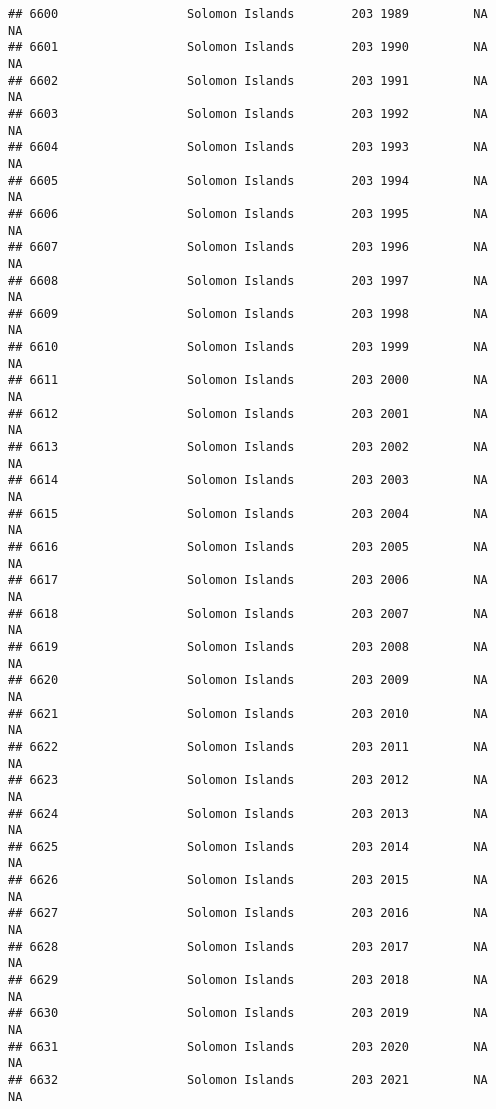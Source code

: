\documentclass[
]{article}
\begin{document}
\begin{verbatim}
## 6600                  Solomon Islands        203 1989         NA         NA
## 6601                  Solomon Islands        203 1990         NA         NA
## 6602                  Solomon Islands        203 1991         NA         NA
## 6603                  Solomon Islands        203 1992         NA         NA
## 6604                  Solomon Islands        203 1993         NA         NA
## 6605                  Solomon Islands        203 1994         NA         NA
## 6606                  Solomon Islands        203 1995         NA         NA
## 6607                  Solomon Islands        203 1996         NA         NA
## 6608                  Solomon Islands        203 1997         NA         NA
## 6609                  Solomon Islands        203 1998         NA         NA
## 6610                  Solomon Islands        203 1999         NA         NA
## 6611                  Solomon Islands        203 2000         NA         NA
## 6612                  Solomon Islands        203 2001         NA         NA
## 6613                  Solomon Islands        203 2002         NA         NA
## 6614                  Solomon Islands        203 2003         NA         NA
## 6615                  Solomon Islands        203 2004         NA         NA
## 6616                  Solomon Islands        203 2005         NA         NA
## 6617                  Solomon Islands        203 2006         NA         NA
## 6618                  Solomon Islands        203 2007         NA         NA
## 6619                  Solomon Islands        203 2008         NA         NA
## 6620                  Solomon Islands        203 2009         NA         NA
## 6621                  Solomon Islands        203 2010         NA         NA
## 6622                  Solomon Islands        203 2011         NA         NA
## 6623                  Solomon Islands        203 2012         NA         NA
## 6624                  Solomon Islands        203 2013         NA         NA
## 6625                  Solomon Islands        203 2014         NA         NA
## 6626                  Solomon Islands        203 2015         NA         NA
## 6627                  Solomon Islands        203 2016         NA         NA
## 6628                  Solomon Islands        203 2017         NA         NA
## 6629                  Solomon Islands        203 2018         NA         NA
## 6630                  Solomon Islands        203 2019         NA         NA
## 6631                  Solomon Islands        203 2020         NA         NA
## 6632                  Solomon Islands        203 2021         NA         NA

\end{verbatim}
\end{document}
